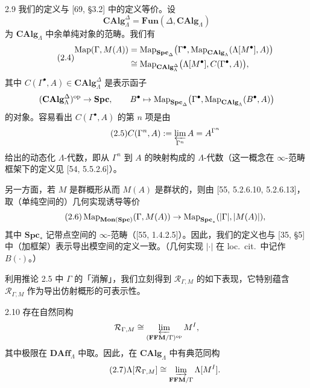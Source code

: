 \begin{rem}{2.9}\label{rem:a2-2-9}
我们的定义与 [69, §3.2] 中的定义等价。设
\[
\mathbf{CAlg}_\Lambda^\Delta=\mathbf{Fun}(\Delta,\mathbf{CAlg}_\Lambda)
\]
为 $\mathbf{CAlg}_\Lambda$ 中余单纯对象的范畴。我们有
\begin{equation}\tag{2.4}
\begin{aligned}
\operatorname{Map}(\Gamma,M(A))&=\operatorname{Map}_{\mathbf{Spc}_\Delta}\bigl(\Gamma^\bullet,\operatorname{Map}_{\mathbf{CAlg}_\Lambda}(\Lambda[M^\bullet],A)\bigr)\\
&\cong\operatorname{Map}_{\mathbf{CAlg}_\Lambda^\Delta}\bigl(\Lambda[M^\bullet],C(\Gamma^\bullet,A)\bigr),
\end{aligned}
\end{equation}
其中 $C(\Gamma^\bullet,A)\in\mathbf{CAlg}_\Lambda^\Delta$ 是表示函子
\[
(\mathbf{CAlg}_\Lambda^\Delta)^{\mathrm{op}}\to\mathbf{Spc},\qquad B^\bullet\mapsto\operatorname{Map}_{\mathbf{Spc}_\Delta}\bigl(\Gamma^\bullet,\operatorname{Map}_{\mathbf{CAlg}_\Lambda}(B^\bullet,A)\bigr)
\]
的对象。容易看出 $C(\Gamma^\bullet,A)$ 的第 $n$ 项是由
\begin{equation}\tag{2.5}
C(\Gamma^n,A):=\varprojlim_{\Gamma^n}A=A^{\Gamma^n}
\end{equation}
给出的动态化 $\Lambda$-代数，即从 $\Gamma^n$ 到 $A$ 的映射构成的 $\Lambda$-代数（这一概念在 $\infty$-范畴框架下的定义见 [54, 5.5.2.6]）。

另一方面，若 $M$ 是群概形从而 $M(A)$ 是群状的，则由 [55, 5.2.6.10, 5.2.6.13]，取（单纯空间的）几何实现诱导等价
\begin{equation}\tag{2.6}
\operatorname{Map}_{\mathbf{Mon}(\mathbf{Spc})}(\Gamma,M(A))\to\operatorname{Map}_{\mathbf{Spc}_*}(|\Gamma|,|M(A)|),
\end{equation}
其中 $\mathbf{Spc}_*$ 记带点空间的 $\infty$-范畴（[55, 1.4.2.5]）。因此，我们的定义也与 [35, §5] 中（加框架）表示导出模空间的定义一致。（几何实现 $|\cdot|$ 在 loc.\ cit.\ 中记作 $B(\cdot)$。）
\end{rem}

利用推论 2.5 中 $\Gamma$ 的「消解」，我们立刻得到 $\mathcal R_{\Gamma,M}$ 的如下表现，它特别蕴含 $\mathcal R_{\Gamma,M}$ 作为导出仿射概形的可表示性。

\begin{prop}{2.10}\label{prop:a2-2-10}
存在自然同构
\[
\mathcal R_{\Gamma,M}\cong\varprojlim_{(\mathbf{FFM}/\Gamma)^{\mathrm{op}}}M^I,
\]
其中极限在 $\mathbf{DAff}_\Lambda$ 中取。因此，在 $\mathbf{CAlg}_\Lambda$ 中有典范同构
\begin{equation}\tag{2.7}
\Lambda[\mathcal R_{\Gamma,M}]\cong\varinjlim_{\mathbf{FFM}/\Gamma}\Lambda[M^I].
\end{equation}
\end{prop}

